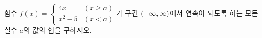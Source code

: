 함수 $f(x)=\begin{cases} 4x & (x\ge a) \\ x^2-5 & (x<a) \end{cases}$가 구간 $(-\infty{,}\mkern3mu\mathopen{}\infty)$에서 연속이 되도록 하는 모든 실수 $a$의 값의 합을 구하시오.
